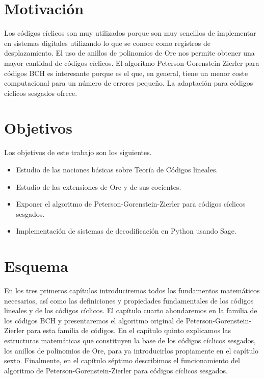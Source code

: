 \section*{Motivación}

Los códigos cíclicos son muy utilizados porque son muy sencillos de implementar en sistemas digitales utilizando lo que se conoce como registros de desplazamiento.
El uso de anillos de polinomios de Ore nos permite obtener una mayor cantidad de códigos cíclicos.
El algoritmo Peterson-Gorenstein-Zierler para códigos BCH es interesante porque es el que, en general, tiene un menor coste computacional para un número de errores pequeño.
La adaptación para códigos cíclicos sesgados ofrece.

\section*{Objetivos}

Los objetivos de este trabajo son los siguientes. \begin{itemize}
  \item Estudio de las nociones básicas sobre Teoría de Códigos lineales.
  \item Estudio de las extensiones de Ore y de sus cocientes.
  \item Exponer el algoritmo de Peterson-Gorenstein-Zierler para códigos cíclicos sesgados.
  \item Implementación de sistemas de decodificación en Python usando Sage.
\end{itemize}

\section*{Esquema}

En los tres primeros capítulos introduciremos todos los fundamentos matemáticos necesarios, así como las definiciones y propiedades fundamentales de los códigos lineales y de los códigos cíclicos.
El capítulo cuarto ahondaremos en la familia de los códigos BCH y presentaremos el algoritmo original de Peterson-Gorenstein-Zierler para esta familia de códigos.
En el capítulo quinto explicamos las estructuras matemáticas que constituyen la base de los códigos cíclicos sesgados, los anillos de polinomios de Ore, para ya introducirlos propiamente en el capítulo sexto.
Finalmente, en el capítulo séptimo describimos el funcionamiento del algoritmo de Peterson-Gorenstein-Zierler para códigos cíclicos sesgados.



